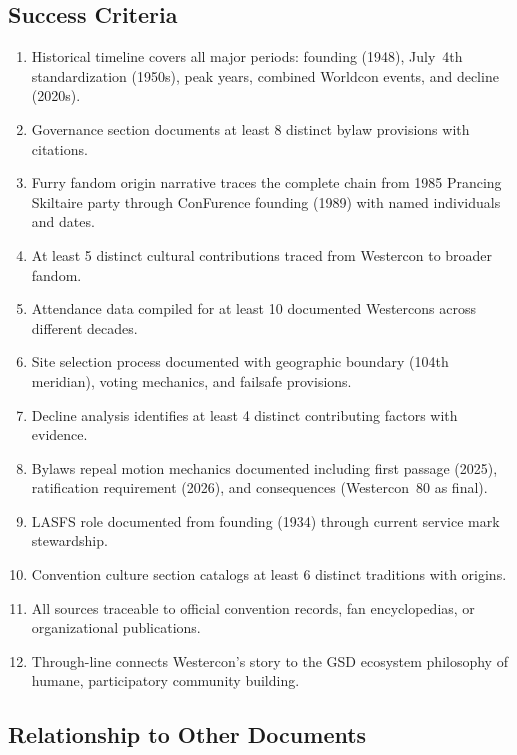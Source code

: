 \documentclass[11pt,letterpaper]{article}
\begin{document}
\subsection{Success Criteria}

\begin{enumerate}[leftmargin=2em]
  \item Historical timeline covers all major periods: founding (1948), July~4th standardization (1950s), peak years, combined Worldcon events, and decline (2020s).
  \item Governance section documents at least 8 distinct bylaw provisions with citations.
  \item Furry fandom origin narrative traces the complete chain from 1985 Prancing Skiltaire party through ConFurence founding (1989) with named individuals and dates.
  \item At least 5 distinct cultural contributions traced from Westercon to broader fandom.
  \item Attendance data compiled for at least 10 documented Westercons across different decades.
  \item Site selection process documented with geographic boundary (104th meridian), voting mechanics, and failsafe provisions.
  \item Decline analysis identifies at least 4 distinct contributing factors with evidence.
  \item Bylaws repeal motion mechanics documented including first passage (2025), ratification requirement (2026), and consequences (Westercon~80 as final).
  \item LASFS role documented from founding (1934) through current service mark stewardship.
  \item Convention culture section catalogs at least 6 distinct traditions with origins.
  \item All sources traceable to official convention records, fan encyclopedias, or organizational publications.
  \item Through-line connects Westercon's story to the GSD ecosystem philosophy of humane, participatory community building.
\end{enumerate}

\subsection{Relationship to Other Documents}
\end{document}
